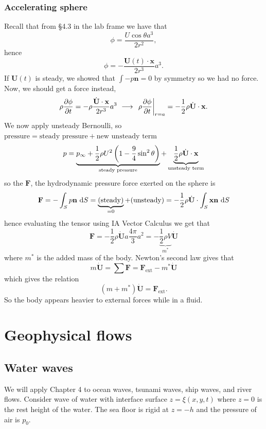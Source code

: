 \documentclass{article}
\begin{document}
\subsubsection{Accelerating sphere}
Recall that from \S 4.3 in the lab frame we have that
\[
	\phi = \frac{U\cos\theta a^3}{2 r^2},
\]
hence
\[
	\phi = -\frac{\mathbf U(t)\cdot\mathbf x}{2r^3}a^3.
\]
If $ \mathbf U(t) $ is steady, we showed that $ \int -p\mathbf n=0 $ by symmetry so we had no force. Now, we should get a force instead,
\[
	\rho\frac{\partial \phi}{\partial t} = - \rho \frac{\dot{\mathbf U }\cdot \mathbf{x}}{2r^3}a^3\ \longrightarrow \ \left . \rho\frac{\partial \phi}{\partial t}\right|_{r=a} = -\frac 12 \rho \dot{\mathbf U}\cdot \mathbf{x}.
\]
We now apply unsteady Bernoulli, so $ \text{pressure} = \text{steady pressure} + \text{new unsteady term} $
\[
	p = \underbrace{p_\infty + \frac 12 \rho U^2\left(1-\frac 94 \sin^2\theta\right)}_{\text{steady pressure}} + \underbrace{\frac 12 \rho \dot{\mathbf U} \cdot \mathbf{x} }_{\text{unsteady term}}
\]
so the $ \mathbf F $, the hydrodynamic pressure force exerted on the sphere is
\[
	\mathbf F = -\int_S p \mathbf n \ \mathrm dS = \underbrace{(\text{steady})}_{=0} + (\text{unsteady}) =  -\frac 12 \rho \dot{\mathbf U} \cdot \int_S \mathbf{x}\mathbf n \ \mathrm dS
\]
hence evaluating the tensor using IA Vector Calculus we get that
\[
	\mathbf F = - \frac 12 \rho \dot{\mathbf U}a \frac{4\pi}3 a^2 = - \underbrace{\frac 12 \rho V}_{m^*} \dot{\mathbf U} 
\]
where $ m^* $ is the added mass of the body. Newton's second law gives that
\[
	m\dot{\mathbf U} = \sum \mathbf F = \mathbf F_{\text{ext}} - m^* \dot{\mathbf U}
\]
which gives the relation
\[
	(m+m^*)\dot{\mathbf U} = \mathbf F_{\text{ext}}.
\]
So the body appears heavier to external forces while in a fluid.
\section{Geophysical flows}
\subsection{Water waves}
We will apply Chapter 4 to ocean waves, tsunami waves, ship waves, and river flows. Consider wave of water with interface surface $ z =\xi(x,y,t) $ where $ z=0 $ is the rest height of the water. The sea floor is rigid at $ z=-h $ and the pressure of air is $ p_0 $.
\end{document}
